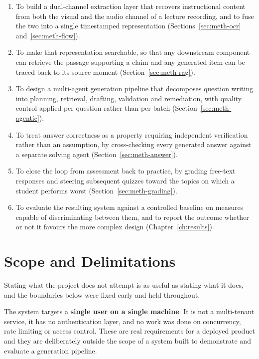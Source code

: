 \begin{enumerate}
  \item To build a dual-channel extraction layer that recovers instructional
        content from both the visual and the audio channel of a lecture
        recording, and to fuse the two into a single timestamped representation
        (Sections~\ref{sec:meth-ocr} and~\ref{sec:meth-flow}).
  \item To make that representation searchable, so that any downstream component
        can retrieve the passage supporting a claim and any generated item can be
        traced back to its source moment (Section~\ref{sec:meth-rag}).
  \item To design a multi-agent generation pipeline that decomposes question
        writing into planning, retrieval, drafting, validation and remediation,
        with quality control applied per question rather than per batch
        (Section~\ref{sec:meth-agentic}).
  \item To treat answer correctness as a property requiring independent
        verification rather than an assumption, by cross-checking every generated
        answer against a separate solving agent (Section~\ref{sec:meth-answer}).
  \item To close the loop from assessment back to practice, by grading free-text
        responses and steering subsequent quizzes toward the topics on which a
        student performs worst (Section~\ref{sec:meth-grading}).
  \item To evaluate the resulting system against a controlled baseline on
        measures capable of discriminating between them, and to report the
        outcome whether or not it favours the more complex design
        (Chapter~\ref{ch:results}).
\end{enumerate}

\section{Scope and Delimitations}
\label{sec:intro-scope}

Stating what the project does not attempt is as useful as stating what it does,
and the boundaries below were fixed early and held throughout.

The system targets a \textbf{single user on a single machine}. It is not a
multi-tenant service, it has no authentication layer, and no work was done on
concurrency, rate limiting or access control. These are real requirements for a
deployed product and they are deliberately outside the scope of a system built
to demonstrate and evaluate a generation pipeline.

